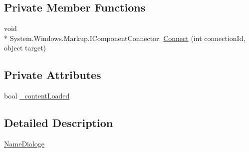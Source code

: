 \subsection*{Private Member Functions}
\begin{DoxyCompactItemize}
\item 
void \\*
System.\-Windows.\-Markup.\-I\-Component\-Connector. \hyperlink{classWpfApplication4_1_1NameDialoge_abd3d69dc9ddc0781f2fe9f31b8331de4}{Connect} (int connection\-Id, object target)
\end{DoxyCompactItemize}
\subsection*{Private Attributes}
\begin{DoxyCompactItemize}
\item 
bool \hyperlink{classWpfApplication4_1_1NameDialoge_ad215f27c234ccc67665ebfb168138fa2}{\-\_\-content\-Loaded}
\end{DoxyCompactItemize}


\subsection{Detailed Description}
\hyperlink{classWpfApplication4_1_1NameDialoge}{Name\-Dialoge} 



